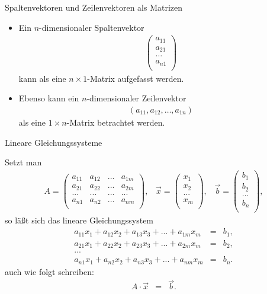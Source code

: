 \documentclass[german]{beamer}
\newcommand{\bq}{\begin{eqnarray*}}
\newcommand{\eq}{\end{eqnarray*}}
\begin{document}
\begin{frame}{Spaltenvektoren und Zeilenvektoren als Matrizen}

\begin{itemize}
\item Ein $n$-dimensionaler Spaltenvektor 
\bq
 \left(\begin{array}{c} a_{11} \\ a_{21} \\ \dots \\ a_{n1} \\ \end{array} \right)
\eq
kann als eine $n \times 1$-Matrix aufgefasst werden.
\item Ebenso kann ein $n$-dimensionaler Zeilenvektor 
\bq
 \left( a_{11}, a_{12}, \dots, a_{1n} \right)
\eq
als eine $1 \times n$-Matrix betrachtet werden.
\end{itemize}

\end{frame}

\begin{frame}{Lineare Gleichungssysteme}

Setzt man
{\small
\bq
A =  
\left( \begin{array}{cccc}
 a_{11} & a_{12} & ... & a_{1m} \\
 a_{21} & a_{22} & ... & a_{2m} \\
 ...    & ...    & ... & ...    \\
 a_{n1} & a_{n2} & ... & a_{nm} \\
\end{array} \right),
 \;\;\;
\vec{x} = \left(\begin{array}{c} x_1 \\ x_2 \\ ... \\ x_m \\ \end{array} \right),
 \;\;\;
\vec{b} = \left(\begin{array}{c} b_1 \\ b_2 \\ ... \\ b_n \\ \end{array} \right),
\eq
}
so l\"a{\ss}t sich das lineare Gleichungssystem
{\small
\bq
 a_{11} x_1 + a_{12} x_2 + a_{13} x_3 + ... + a_{1m} x_m & = & b_1,
\nonumber \\
 a_{21} x_1 + a_{22} x_2 + a_{23} x_3 + ... + a_{2m} x_m & = & b_2,
\nonumber \\
 ... & & 
\nonumber \\
 a_{n1} x_1 + a_{n2} x_2 + a_{n3} x_3 + ... + a_{nm} x_m & = & b_n.
\eq
}
auch wie folgt schreiben:
\bq
 A \cdot \vec{x} & = & \vec{b}.
\eq

\end{frame}
\end{document}
